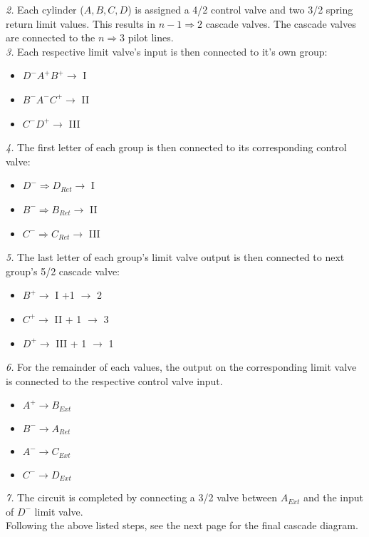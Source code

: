 \textit{2.} Each cylinder ($A,B,C,D$) is assigned a 4/2 control valve and two 3/2 spring return limit values. This results in $n-1\Rightarrow 2$ cascade valves. The cascade valves are connected to the $n \Rightarrow 3$ pilot lines.\\

\textit{3.} Each respective limit valve's input is then connected to it's own group:
\begin{itemize}
	\item $D^- A^+ B^+\rightarrow$ I
	\item $B^- A^- C^+\rightarrow$ II
	\item $C^- D^+ \rightarrow$ III\\
\end{itemize}

\textit{4.}  The first letter of each group is then connected to its corresponding control valve:
\begin{itemize}
	\item $D^- \Rightarrow D_{Ret} \rightarrow$ I
	\item $B^- \Rightarrow B_{Ret} \rightarrow$ II
	\item $C^- \Rightarrow C_{Ret} \rightarrow$ III\\
\end{itemize}

\textit{5.}  The last letter of each group's limit valve output is then connected to next group's 5/2 cascade valve:
\begin{itemize}
	\item $B^+ \rightarrow$ I +1 $\rightarrow$ 2
	\item $C^+ \rightarrow$ II + 1 $\rightarrow$ 3
	\item $D^+ \rightarrow$ III + 1  $\rightarrow$ 1\\
\end{itemize}


\textit{6.} For the remainder of each values, the output on the corresponding limit valve is connected to the respective control valve input.
\begin{itemize}
	\item $A^+ \rightarrow B_{Ext}$
	\item $B^- \rightarrow A_{Ret}$
	\item $A^- \rightarrow C_{Ext}$
	\item $C^- \rightarrow D_{Ext}$\\
\end{itemize}

\textit{7.} The circuit is completed by connecting a 3/2 valve between $A_{Ext}$ and the input of $D^-$ limit valve.\\

Following the above listed steps, see the next page for the final cascade diagram.\\

\pagebreak
